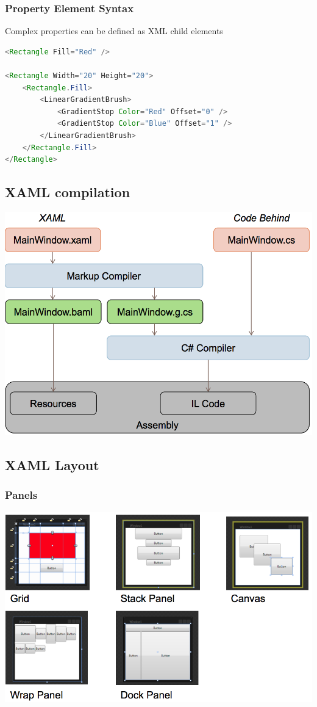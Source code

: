 \documentclass[10pt]{article}
\begin{document}
\subsubsection{Property Element Syntax}
Complex properties can be defined as XML child elements
\begin{lstlisting}[language=Java, caption=Property Element Syntax, style=JavaStyle]
<Rectangle Fill="Red" />

<Rectangle Width="20" Height="20">
	<Rectangle.Fill>
		<LinearGradientBrush>
			<GradientStop Color="Red" Offset="0" />
			<GradientStop Color="Blue" Offset="1" />
		</LinearGradientBrush>
	</Rectangle.Fill>
</Rectangle>
\end{lstlisting}
\subsection{XAML compilation}
\begin{center}
	\includegraphics[scale=0.3]{xaml_compilation.png}
\end{center}
\subsection{XAML Layout}
\subsubsection{Panels}
\begin{center}
	\includegraphics[scale=0.3]{xaml_panels.png}
\end{center}
\end{document}
